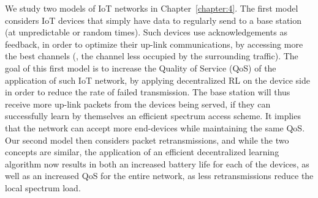 %
We study two models of IoT networks in Chapter~\ref{chapter:4}.
The first model considers IoT devices that simply have data to regularly send to a base station (at unpredictable or random times).
Such devices use acknowledgements as feedback, in order to optimize their up-link communications, by accessing more the best channels (\ie, the channel less occupied by the surrounding traffic).
The goal of this first model is to increase the Quality of Service (QoS) of the application of such IoT network, by applying decentralized RL on the device side in order to reduce the rate of failed transmission.
The base station will thus receive more up-link packets from the devices being served, if they can successfully learn by themselves an efficient spectrum access scheme.
It implies that the network can accept more end-devices while maintaining the same QoS.
%
Our second model then considers packet retransmissions, and while the two concepts are similar, the application of an efficient decentralized learning algorithm now results in both an increased battery life for each of the devices, as well as an increased QoS for the entire network, as less retransmissions reduce the local spectrum load.

